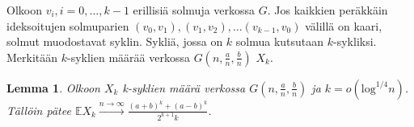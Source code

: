 \documentclass[finnish,12pt,a4paper,pdftex,sci,utf8]{aaltothesis}
\newtheorem{lemma}{Lemma}
\begin{document}
Olkoon $v_i, i = 0, \ldots, k-1$ erillisiä solmuja verkossa $G$. Jos kaikkien peräkkäin ideksoitujen solmuparien $(v_0, v_1), (v_1, v_2), \ldots (v_{k-1}, v_0)$ välillä on kaari, solmut muodostavat syklin. Sykliä, jossa on $k$ solmua kutsutaan $k$-sykliksi. Merkitään $k$-syklien määrää verkossa $G(n, \frac{a}{n}, \frac{b}{n})$ $X_k$.

\begin{lemma}
	\label{lemma:k-syklit_odotus}
	Olkoon $X_k$ k-syklien määrä verkossa $G(n,\frac{a}{n},\frac{b}{n})$ ja $k = o(\text{log}^{1/4}n)$. Tällöin pätee $\mathbb{E}X_k \xrightarrow{n \rightarrow \infty} \frac{(a+b)^k + (a-b)^k}{2^{k+1}k}$. 
\end{lemma}
\end{document}
